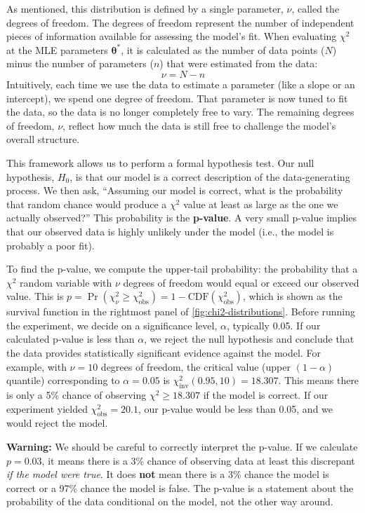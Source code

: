 As mentioned, this distribution is defined by a single parameter, $\nu$, called the degrees of freedom. The degrees of freedom represent the number of independent pieces of information available for assessing the model's fit. When evaluating $\chi^2$ at the MLE parameters $\boldsymbol{\theta}^*$, it is calculated as the number of data points ($N$) minus the number of parameters ($n$) that were estimated from the data:
\begin{equation}
    \nu = N - n
\end{equation}
Intuitively, each time we use the data to estimate a parameter (like a slope or an intercept), we spend one degree of freedom. That parameter is now tuned to fit the data, so the data is no longer completely free to vary. The remaining degrees of freedom, $\nu$, reflect how much the data is still free to challenge the model's overall structure.

This framework allows us to perform a formal hypothesis test. Our null hypothesis, $H_0$, is that our model is a correct description of the data-generating process. We then ask, ``Assuming our model is correct, what is the probability that random chance would produce a $\chi^2$ value at least as large as the one we actually observed?'' This probability is the \textbf{p-value}. A very small p-value implies that our observed data is highly unlikely under the model (i.e., the model is probably a poor fit).

To find the p-value, we compute the upper-tail probability: the probability that a $\chi^2$ random variable with $\nu$ degrees of freedom would equal or exceed our observed value. This is $p = \Pr(\chi^2_\nu \ge \chi^2_{\text{obs}}) = 1 - \text{CDF}(\chi^2_{\text{obs}})$, which is shown as the survival function in the rightmost panel of \autoref{fig:chi2-distributions}. Before running the experiment, we decide on a significance level, $\alpha$, typically 0.05. If our calculated p-value is less than $\alpha$, we reject the null hypothesis and conclude that the data provides statistically significant evidence against the model. For example, with $\nu=10$ degrees of freedom, the critical value (upper $(1-\alpha)$ quantile) corresponding to $\alpha=0.05$ is $\chi^2_{\text{inv}}(0.95, 10) = 18.307$. This means there is only a 5\% chance of observing $\chi^2 \ge 18.307$ if the model is correct. If our experiment yielded $\chi^2_{\text{obs}} = 20.1$, our p-value would be less than 0.05, and we would reject the model.

\begin{warningBox}
    \textbf{Warning:} We should be careful to correctly interpret the p-value. If we calculate $p=0.03$, it means there is a 3\% chance of observing data at least this discrepant \textit{if the model were true}. It does \textbf{not} mean there is a 3\% chance the model is correct or a 97\% chance the model is false. The p-value is a statement about the probability of the data conditional on the model, not the other way around.
\end{warningBox}

